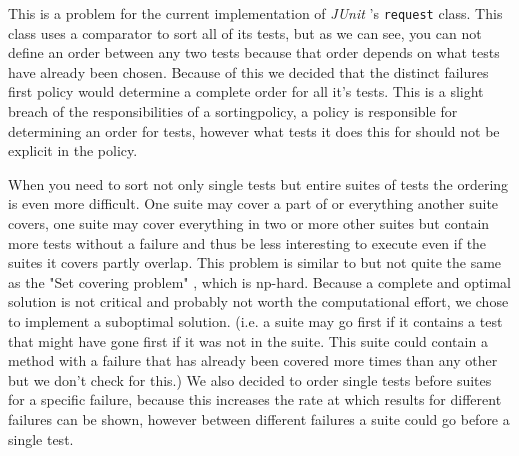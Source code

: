 \documentclass[i2]{oss}
\newcommand{\class}[1]{\texttt{#1}}
\newcommand{\junit}{\emph{JUnit }}
\begin{document}
This is a problem for the current implementation of \junit's 
\class{request} class.
This class uses a comparator to sort all of its tests, but as we can 
see, you can not define an order between any two tests because that 
order depends on what tests have already been chosen.
Because of this we decided that the distinct failures first policy would
determine a complete order for all it's tests.
This is a slight breach of the responsibilities of a sortingpolicy,
a policy is responsible for determining an order for tests,
however what tests it does this for should not be explicit in the 
policy.

When you need to sort not only single tests but entire suites of tests 
the ordering is even more difficult.
One suite may cover a part of or everything another suite covers, one 
suite may cover everything in two or more other suites but contain more 
tests without a failure and thus be less interesting to execute even if 
the suites it covers partly overlap.
This problem is similar to but not quite the same as the
"Set covering problem" \cite{scp}, which is np-hard.
Because a complete and optimal solution is not critical and probably 
not worth the computational effort, we chose to implement a suboptimal 
solution. (i.e. a suite may go first if it contains a test that might 
have gone first if it was not in the suite. This suite could contain a 
method with a failure that has already been covered more times than any 
other but we don't check for this.)
We also decided to order single tests before suites for a specific 
failure, because this increases the rate at which results for different 
failures can be shown, however between different failures a suite could 
go before a single test.
\end{document}
